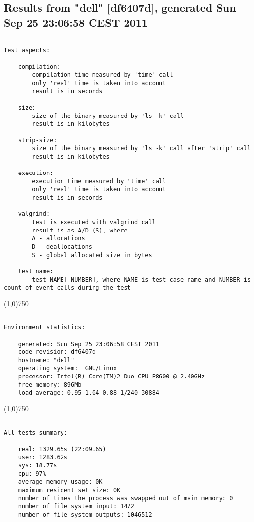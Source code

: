 \clearpage
\subsection{Results from "dell" [df6407d], generated Sun Sep 25 23:06:58 CEST 2011}
\begin{verbatim}

Test aspects:

    compilation:
        compilation time measured by 'time' call
        only 'real' time is taken into account
        result is in seconds

    size:
        size of the binary measured by 'ls -k' call
        result is in kilobytes

    strip-size:
        size of the binary measured by 'ls -k' call after 'strip' call
        result is in kilobytes

    execution:
        execution time measured by 'time' call
        only 'real' time is taken into account
        result is in seconds

    valgrind:
        test is executed with valgrind call
        result is as A/D (S), where
        A - allocations
        D - deallocations
        S - global allocated size in bytes

    test name:
        test_NAME[_NUMBER], where NAME is test case name and NUMBER is count of event calls during the test
\end{verbatim}
\begin{center}
\line(1,0){750}
\end{center}
\begin{verbatim}

Environment statistics:

    generated: Sun Sep 25 23:06:58 CEST 2011
    code revision: df6407d
    hostname: "dell"
    operating system:  GNU/Linux
    processor: Intel(R) Core(TM)2 Duo CPU P8600 @ 2.40GHz
    free memory: 896Mb
    load average: 0.95 1.04 0.88 1/240 30884
\end{verbatim}
\begin{center}
\line(1,0){750}
\end{center}
\begin{verbatim}

All tests summary:

    real: 1329.65s (22:09.65)
    user: 1283.62s
    sys: 18.77s
    cpu: 97%
    average memory usage: 0K
    maximum resident set size: 0K
    number of times the process was swapped out of main memory: 0
    number of file system input: 1472
    number of file system outputs: 1046512
\end{verbatim}
